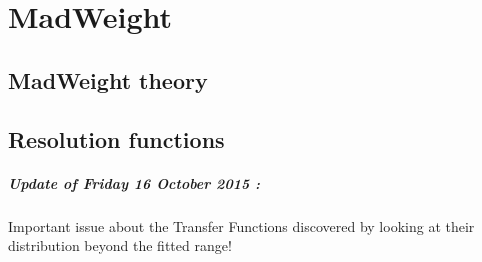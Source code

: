\chapter{MadWeight} \label{ch::MW}

\section{MadWeight theory} \label{sec::MWTheory}

\section{Resolution functions} \label{sec::TF}

\paragraph{Update of Friday 16 October 2015 :} 
Important issue about the Transfer Functions discovered by looking at their distribution beyond the fitted range!
\\

